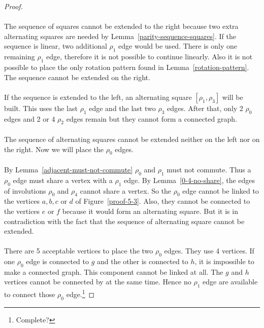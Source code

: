 \begin{proof}
\paragraph{}
The sequence of squares cannot be extended to the right because two extra alternating squares are needed by Lemma~\ref{parity-sequence-squares}. If the sequence is linear, two additional $\rho_1$ edge would be used. There is only one remaining $\rho_1$ edge, therefore it is not possible to continue linearly. Also it is not possible to place the only rotation pattern found in Lemma~\ref{rotation-pattern}. The sequence cannot be extended on the right.

\paragraph{}
If the sequence is extended to the left, an alternating square $[\rho_1, \rho_3]$ will be built. This uses the last $\rho_1$ edge and the last two $\rho_3$ edges. After that, only 2 $\rho_0$ edges and 2 or 4 $\rho_2$ edges remain but they cannot form a connected graph.

\paragraph{}
The sequence of alternating squares cannot be extended neither on the left nor on the right. Now we will place the $\rho_0$ edges.

\paragraph{}
By Lemma~\ref{adjacent-must-not-commute} $\rho_0$ and $\rho_1$ must not commute. Thus a $\rho_0$ edge must share a vertex with a $\rho_1$ edge. By Lemma~\ref{0-4-no-share}, the edges of involutions $\rho_0$ and $\rho_4$ cannot share a vertex. So the $\rho_0$ edge cannot be linked to the vertices $a, b, c$ or $d$ of Figure~\ref{proof-5-3}. Also, they cannot be connected to the vertices $e$ or $f$ because it would form an alternating square. But it is in contradiction with the fact that the sequence of alternating square cannot be extended.

\paragraph{}
There are 5 acceptable vertices to place the two $\rho_0$ edges. They use 4 vertices. If one $\rho_0$ edge is connected to $g$ and the other is connected to $h$, it is impossible to make a connected graph. This component cannot be linked at all. The $g$ and $h$ vertices cannot be connected by at the same time. Hence no $\rho_1$ edge are available to connect those $\rho_0$ edge.\footnote{Complete?}


\end{proof}
